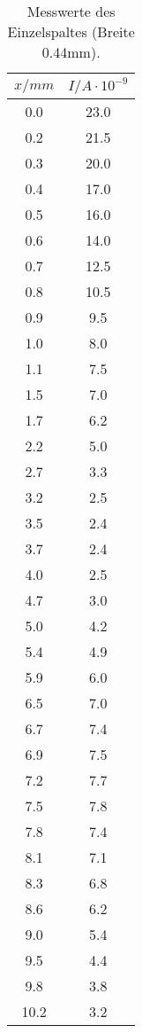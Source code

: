 \begin{table}
\centering
\caption{Messwerte des Einzelspaltes (Breite 0.44mm).}
\begin{minipage}{0.25\textwidth}
	\label{tab:a}
	\begin{tabular}{c|c}
		\toprule
		{$x / mm$} & {$I / A\cdot10^{-9}$} \\
		\hline
        \midrule
        0.0 & 23.0\\
        0.2 & 21.5\\
        0.3 & 20.0\\
        0.4 & 17.0\\
        0.5 & 16.0\\
        0.6 & 14.0\\
        0.7 & 12.5\\
        0.8 & 10.5\\
        0.9 & 9.5\\
        1.0 & 8.0\\
        1.1 & 7.5\\
        1.5 & 7.0\\
        1.7 & 6.2\\
        2.2 & 5.0\\
        2.7 & 3.3\\
        3.2 & 2.5\\
        3.5 & 2.4\\
        3.7 & 2.4\\
        4.0 & 2.5\\
        4.7 & 3.0\\
        5.0 & 4.2\\
        5.4 & 4.9\\
        5.9 & 6.0\\
        6.5 & 7.0\\
        6.7 & 7.4\\
        6.9 & 7.5\\
        7.2 & 7.7\\
        7.5 & 7.8\\
        7.8 & 7.4\\
        8.1 & 7.1\\
        8.3 & 6.8\\
        8.6 & 6.2\\
        9.0 &5.4\\
        9.5 & 4.4\\
        9.8 & 3.8\\
        10.2 & 3.2\\
		\bottomrule 
	\end{tabular}

\end{minipage}
\end{table}

